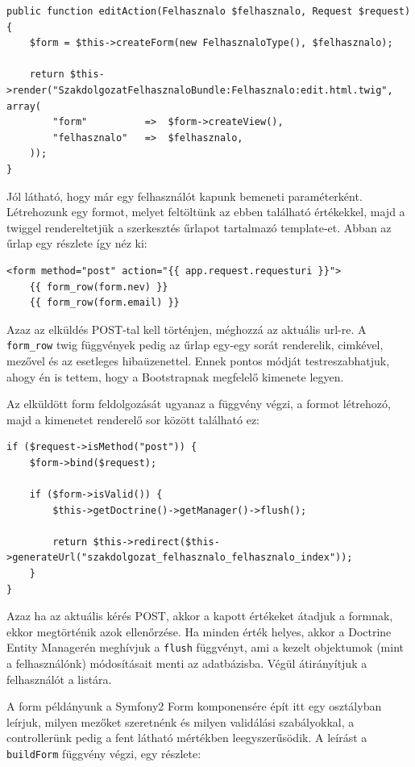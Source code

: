 \documentclass[a4paper,12pt,oneside]{report}
\begin{document}
\begin{lstlisting}
public function editAction(Felhasznalo $felhasznalo, Request $request)
{
    $form = $this->createForm(new FelhasznaloType(), $felhasznalo);

    return $this->render("SzakdolgozatFelhasznaloBundle:Felhasznalo:edit.html.twig", array(
        "form"          =>  $form->createView(),
        "felhasznalo"   =>  $felhasznalo,
    ));
}
\end{lstlisting}

Jól látható, hogy már egy felhasználót kapunk bemeneti paraméterként. Létrehozunk egy formot, melyet feltöltünk az ebben található értékekkel, majd a twiggel rendereltetjük a szerkesztés űrlapot tartalmazó template-et. Abban az űrlap egy részlete így néz ki:

\begin{lstlisting}
<form method="post" action="{{ app.request.requesturi }}">
    {{ form_row(form.nev) }}
    {{ form_row(form.email) }}
\end{lstlisting}

Azaz az elküldés POST-tal kell történjen, méghozzá az aktuális url-re. A {\tt form\_row} twig függvények pedig az űrlap egy-egy sorát renderelik, cimkével, mezővel és az esetleges hibaüzenettel. Ennek pontos módját testreszabhatjuk, ahogy én is tettem, hogy a Bootstrapnak megfelelő kimenete legyen.

Az elküldött form feldolgozását ugyanaz a függvény végzi, a formot létrehozó, majd a kimenetet renderelő sor között található ez:

\begin{lstlisting}
if ($request->isMethod("post")) {
    $form->bind($request);

    if ($form->isValid()) {
        $this->getDoctrine()->getManager()->flush();

        return $this->redirect($this->generateUrl("szakdolgozat_felhasznalo_felhasznalo_index"));
    }
}
\end{lstlisting}

Azaz ha az aktuális kérés POST, akkor a kapott értékeket átadjuk a formnak, ekkor megtörténik azok ellenőrzése. Ha minden érték helyes, akkor a Doctrine Entity Managerén meghívjuk a {\tt flush} függvényt, ami a kezelt objektumok (mint a felhasználónk) módosításait menti az adatbázisba. Végül átirányítjuk a felhasználót a listára.

A form példányunk a Symfony2 Form komponensére épít \textendash{} itt egy osztályban leírjuk, milyen mezőket szeretnénk és milyen validálási szabályokkal, a controllerünk pedig a fent látható mértékben leegyszerűsödik. A leírást a {\tt buildForm} függvény végzi, egy részlete:
\end{document}

